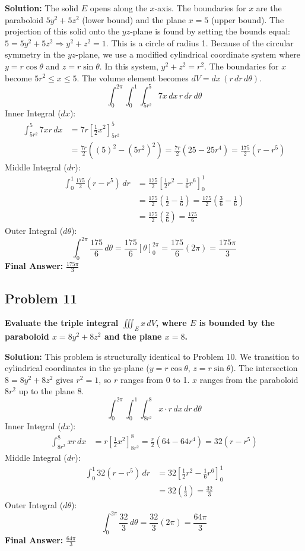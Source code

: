 \documentclass[12pt]{article}
\begin{document}
\textbf{Solution:}
The solid $E$ opens along the $x$-axis. The boundaries for $x$ are the paraboloid $5y^2 + 5z^2$ (lower bound) and the plane $x=5$ (upper bound).
The projection of this solid onto the $yz$-plane is found by setting the bounds equal: $5 = 5y^2 + 5z^2 \Rightarrow y^2 + z^2 = 1$. This is a circle of radius 1.
Because of the circular symmetry in the $yz$-plane, we use a modified cylindrical coordinate system where $y = r\cos\theta$ and $z = r\sin\theta$. 
In this system, $y^2+z^2 = r^2$. The boundaries for $x$ become $5r^2 \le x \le 5$. 
The volume element becomes $dV = dx \, (r \, dr \, d\theta)$.
\[ \int_{0}^{2\pi} \int_{0}^{1} \int_{5r^2}^{5} 7x \, dx \, r \, dr \, d\theta \]
Inner Integral ($dx$):
\begin{align*} 
\int_{5r^2}^{5} 7xr \, dx &= 7r \left[ \frac{1}{2}x^2 \right]_{5r^2}^{5} \\
&= \frac{7r}{2} \left( (5)^2 - (5r^2)^2 \right) = \frac{7r}{2} (25 - 25r^4) = \frac{175}{2} (r - r^5)
\end{align*}
Middle Integral ($dr$):
\begin{align*} 
\int_{0}^{1} \frac{175}{2} (r - r^5) \, dr &= \frac{175}{2} \left[ \frac{1}{2}r^2 - \frac{1}{6}r^6 \right]_{0}^{1} \\
&= \frac{175}{2} \left( \frac{1}{2} - \frac{1}{6} \right) = \frac{175}{2} \left( \frac{3}{6} - \frac{1}{6} \right) \\
&= \frac{175}{2} \left( \frac{2}{6} \right) = \frac{175}{6}
\end{align*}
Outer Integral ($d\theta$):
\[ \int_{0}^{2\pi} \frac{175}{6} \, d\theta = \frac{175}{6} [\theta]_{0}^{2\pi} = \frac{175}{6}(2\pi) = \frac{175\pi}{3} \]
\textbf{Final Answer:} $\frac{175\pi}{3}$

\vspace{0.5cm}
\subsection*{Problem 11}
\textbf{Evaluate the triple integral $\iiint_E x \, dV$, where $E$ is bounded by the paraboloid $x = 8y^2 + 8z^2$ and the plane $x = 8$.}

\textbf{Solution:}
This problem is structurally identical to Problem 10. We transition to cylindrical coordinates in the $yz$-plane ($y=r\cos\theta$, $z=r\sin\theta$). 
The intersection $8 = 8y^2+8z^2$ gives $r^2=1$, so $r$ ranges from 0 to 1.
$x$ ranges from the paraboloid $8r^2$ up to the plane $8$.
\[ \int_{0}^{2\pi} \int_{0}^{1} \int_{8r^2}^{8} x \cdot r \, dx \, dr \, d\theta \]
Inner Integral ($dx$):
\begin{align*} 
\int_{8r^2}^{8} xr \, dx &= r \left[ \frac{1}{2}x^2 \right]_{8r^2}^{8} = \frac{r}{2} (64 - 64r^4) = 32(r - r^5)
\end{align*}
Middle Integral ($dr$):
\begin{align*} 
\int_{0}^{1} 32(r - r^5) \, dr &= 32 \left[ \frac{1}{2}r^2 - \frac{1}{6}r^6 \right]_{0}^{1} \\
&= 32 \left( \frac{1}{3} \right) = \frac{32}{3}
\end{align*}
Outer Integral ($d\theta$):
\[ \int_{0}^{2\pi} \frac{32}{3} \, d\theta = \frac{32}{3} (2\pi) = \frac{64\pi}{3} \]
\textbf{Final Answer:} $\frac{64\pi}{3}$
\end{document}
